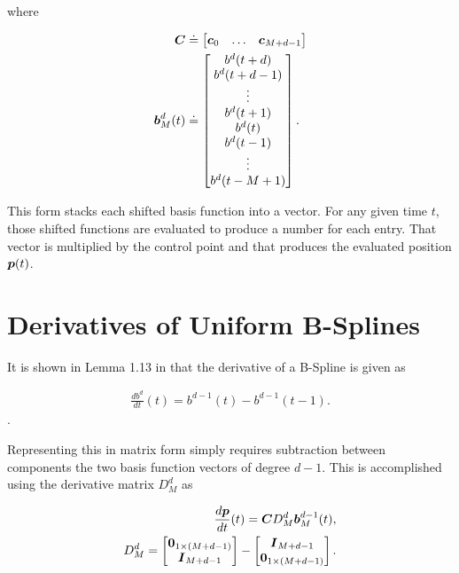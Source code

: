 where

\begin{align}
	\boldsymbol{C} &\doteq \begin{bmatrix} \boldsymbol{c}_0 & \dots & \boldsymbol{c}_{M+d-1} \end{bmatrix}
	\\
	\boldsymbol{b}^d_M(t) &\doteq \begin{bmatrix}
			b^d(t+d) \\
			b^d(t+d-1) \\
			\vdots \\
			b^d(t+1) \\
			b^d(t) \\
			b^d(t-1)\\
			\vdots \\
			b^d(t-M+1)
		\end{bmatrix}.
\end{align}

This form stacks each shifted basis function into a vector. 
For any given time $t$, those shifted functions are evaluated to produce a number for each entry. 
That vector is multiplied by the control point and that produces the evaluated position $\boldsymbol{p}(t)$. 

\section{Derivatives of Uniform B-Splines}

It is shown in Lemma 1.13 in \cite{beard2025BSplines} that the derivative of a B-Spline is given as

\begin{align}
    \frac{db^d}{dt}(t) = b^{d-1}(t) - b^{d-1}(t-1).
\end{align}.

Representing this in matrix form simply requires subtraction between components the two basis function vectors of degree $d-1$. 
This is accomplished using the derivative matrix $D_M^d$ as

\begin{align}
    \frac{d\boldsymbol{p}}{dt}(t) = \boldsymbol{C} D_M^{d} \boldsymbol{b}_M^{d-1}(t),\\
    D_M^{d} = 
    \begin{bmatrix}
        \boldsymbol{0}_{1\times(M+d-1)} \\ \boldsymbol{I}_{M+d-1} 
    \end{bmatrix} 
 	-\begin{bmatrix}
        \boldsymbol{I}_{M+d-1} \\ \boldsymbol{0}_{1\times(M+d-1)} 
    \end{bmatrix}.
\end{align}

